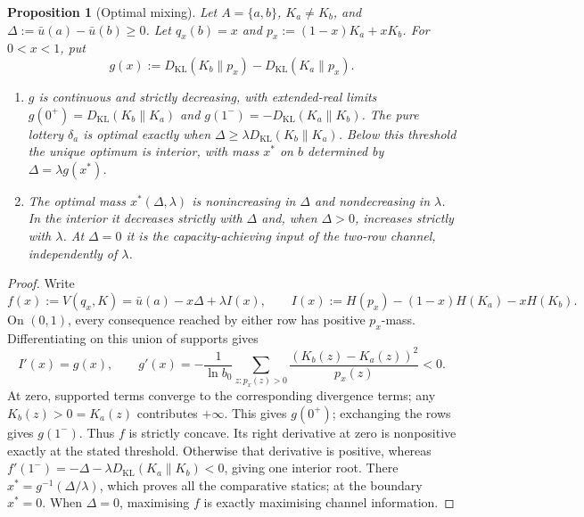 \documentclass[11pt,a4paper]{article}
\newtheorem{proposition}[theorem]{Proposition}
\theoremstyle{definition}
\newcommand{\Sh}{H}
\newcommand{\KL}{D_{\mathrm{KL}}}
\newcommand{\1}{\mathbf 1}
\begin{document}
\begin{samepage}
\begin{proposition}[Optimal mixing]\label{prop:binary}
Let $A=\{a,b\}$, $K_a\ne K_b$, and
$\Delta:=\bar u(a)-\bar u(b)\ge0$.  Let $q_x(b)=x$ and
$p_x:=(1-x)K_a+xK_b$.  For $0<x<1$, put
\[
g(x):=\KL(K_b\|p_x)-\KL(K_a\|p_x).
\]
\begin{enumerate}[label=\textup{(\roman*)},leftmargin=*]
\item $g$ is continuous and strictly decreasing, with extended-real limits
$g(0^+)=\KL(K_b\|K_a)$ and $g(1^-)=-\KL(K_a\|K_b)$.
The pure lottery $\delta_a$ is optimal exactly when
$\Delta\ge\lambda\KL(K_b\|K_a)$.  Below this threshold the unique
optimum is interior, with mass $x^*$ on $b$ determined by
$\Delta=\lambda g(x^*)$.
\item The optimal mass $x^*(\Delta,\lambda)$ is nonincreasing in $\Delta$
and nondecreasing in $\lambda$.  In the interior it decreases strictly
with $\Delta$ and, when $\Delta>0$, increases strictly with $\lambda$.
At $\Delta=0$ it is the capacity-achieving input of the two-row channel,
independently of $\lambda$.
\end{enumerate}
\end{proposition}
\end{samepage}

\begin{proof}
Write
\[
f(x):=V(q_x,K)=\bar u(a)-x\Delta+\lambda I(x),\qquad
I(x):=\Sh(p_x)-(1-x)\Sh(K_a)-x\Sh(K_b).
\]
On $(0,1)$, every consequence reached by either row has positive
$p_x$-mass.  Differentiating on this union of supports gives
\[
I'(x)=g(x),\qquad
g'(x)=-\frac1{\ln b_0}\sum_{z: p_x(z)>0}
\frac{(K_b(z)-K_a(z))^2}{p_x(z)}<0.
\]
At zero, supported terms converge
to the corresponding divergence terms; any $K_b(z)>0=K_a(z)$ contributes
$+\infty$.  This gives $g(0^+)$; exchanging the rows gives $g(1^-)$.
Thus $f$ is strictly concave.  Its right derivative at zero is nonpositive
exactly at the stated threshold.  Otherwise that derivative is positive,
whereas $f'(1^-)=-\Delta-\lambda\KL(K_a\|K_b)<0$, giving one interior
root.  There $x^*=g^{-1}(\Delta/\lambda)$, which proves all the comparative
statics; at the boundary $x^*=0$.  When $\Delta=0$, maximising $f$ is
exactly maximising channel information.
\end{proof}
\end{document}
